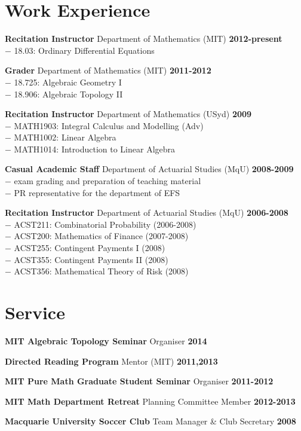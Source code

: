 \documentclass[margin,line]{resume}
\newcommand{\award}[3]{\textbf{#1} #2 \hfill \textbf{#3}
           
\vspace{-2.3mm}}
\newcommand{\twolineaward}[4]{\textbf{#1} #2 \hfill \textbf{#4}\\%
#3
           
\vspace{-2.3mm}}
\begin{document}
\begin{resume}
         \section{\mysidestyle Work Experience}
\twolineaward{Recitation Instructor}{Department of Mathematics (MIT)}{\phantom{space}$-$ 18.03: Ordinary Differential Equations}{2012-present}
\twolineaward{Grader}{Department of Mathematics (MIT)}{%
\phantom{space}$-$ 18.725: Algebraic Geometry I\\
\phantom{space}$-$ 18.906: Algebraic Topology II%
}{2011-2012}
\twolineaward{Recitation Instructor}{Department of Mathematics (USyd)}{%
\phantom{space}$-$ MATH1903: Integral Calculus and Modelling (Adv)\\
\phantom{space}$-$ MATH1002: Linear Algebra\\
\phantom{space}$-$ MATH1014: Introduction to Linear Algebra%
}{2009}
\twolineaward{Casual Academic Staff}{Department of Actuarial Studies (MqU)}{%
\phantom{space}$-$ exam grading and preparation of teaching material\\
\phantom{space}$-$ PR representative for the department of EFS%
}{2008-2009}
\twolineaward{Recitation Instructor}{Department of Actuarial Studies (MqU)}{%
\phantom{space}$-$ ACST211: Combinatorial Probability (2006-2008)\\
\phantom{space}$-$ ACST200: Mathematics of Finance (2007-2008)\\
\phantom{space}$-$ ACST255: Contingent Payments I (2008)\\
\phantom{space}$-$ ACST355: Contingent Payments II (2008)\\
\phantom{space}$-$ ACST356: Mathematical Theory of Risk (2008)%
}{2006-2008}


\vspace{2mm}


   \section{\mysidestyle Service}
\award{MIT Algebraic Topology Seminar}{Organiser}{2014}
\award{Directed Reading Program}{Mentor (MIT)}{2011,2013}
\award{MIT Pure Math Graduate Student Seminar}{Organiser}{2011-2012}
\award{MIT Math Department Retreat}{Planning Committee Member}{2012-2013}
\award{Macquarie University Soccer Club}{Team Manager \& Club Secretary}{2008}



\end{resume}
\end{document}
